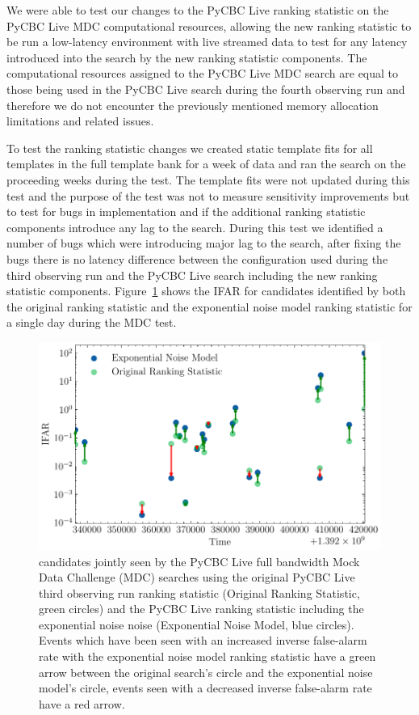 We were able to test our changes to the PyCBC Live ranking statistic on the PyCBC Live MDC computational resources, allowing the new ranking statistic to be run a low-latency environment with live streamed data to test for any latency introduced into the search by the new ranking statistic components. The computational resources assigned to the PyCBC Live MDC search are equal to those being used in the PyCBC Live search during the fourth observing run and therefore we do not encounter the previously mentioned memory allocation limitations and related issues.

To test the ranking statistic changes we created static template fits for all templates in the full template bank for a week of data and ran the search on the proceeding weeks during the test. The template fits were not updated during this test and the purpose of the test was not to measure sensitivity improvements but to test for bugs in implementation and if the additional ranking statistic components introduce any lag to the search. During this test we identified a number of bugs which were introducing major lag to the search, after fixing the bugs there is no latency difference between the configuration used during the third observing run and the PyCBC Live search including the new ranking statistic components. Figure~\ref{5:fig:mdc_results} shows the IFAR for \gwadj candidates identified by both the original ranking statistic and the exponential noise model ranking statistic for a single day during the MDC test.
%
\begin{figure}
    \centering
    \includegraphics[width=1.0\linewidth]{images/5_pycbclive/mdc_ifar_candidates.pdf}
    \caption{\Gwadj candidates jointly seen by the PyCBC Live full bandwidth Mock Data Challenge (MDC) searches using the original PyCBC Live third observing run ranking statistic (Original Ranking Statistic, green circles) and the PyCBC Live ranking statistic including the exponential noise noise (Exponential Noise Model, blue circles). Events which have been seen with an increased inverse false-alarm rate with the exponential noise model ranking statistic have a green arrow between the original search's circle and the exponential noise model's circle, events seen with a decreased inverse false-alarm rate have a red arrow.}
    \label{5:fig:mdc_results}
\end{figure}
%





